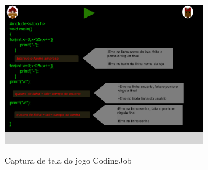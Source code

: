 \begin{figure}[H]
	\centering
	\caption{Captura de tela do jogo CodingJob}
	\includegraphics[width=0.8\textwidth]{images/codingjob.png}
	\label{fig:codingjob}
\end{figure}
